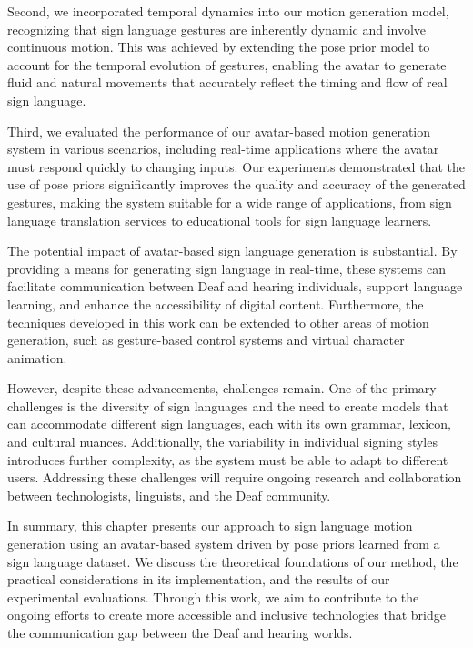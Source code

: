 \documentclass[../../main.tex]{subfiles}
\begin{document}
Second, we incorporated temporal dynamics into our motion generation model, recognizing that sign language gestures are inherently dynamic and involve continuous motion. This was achieved by extending the pose prior model to account for the temporal evolution of gestures, enabling the avatar to generate fluid and natural movements that accurately reflect the timing and flow of real sign language.

Third, we evaluated the performance of our avatar-based motion generation system in various scenarios, including real-time applications where the avatar must respond quickly to changing inputs. Our experiments demonstrated that the use of pose priors significantly improves the quality and accuracy of the generated gestures, making the system suitable for a wide range of applications, from sign language translation services to educational tools for sign language learners.

The potential impact of avatar-based sign language generation is substantial. By providing a means for generating sign language in real-time, these systems can facilitate communication between Deaf and hearing individuals, support language learning, and enhance the accessibility of digital content. Furthermore, the techniques developed in this work can be extended to other areas of motion generation, such as gesture-based control systems and virtual character animation.

However, despite these advancements, challenges remain. One of the primary challenges is the diversity of sign languages and the need to create models that can accommodate different sign languages, each with its own grammar, lexicon, and cultural nuances. Additionally, the variability in individual signing styles introduces further complexity, as the system must be able to adapt to different users. Addressing these challenges will require ongoing research and collaboration between technologists, linguists, and the Deaf community.

In summary, this chapter presents our approach to sign language motion generation using an avatar-based system driven by pose priors learned from a sign language dataset. We discuss the theoretical foundations of our method, the practical considerations in its implementation, and the results of our experimental evaluations. Through this work, we aim to contribute to the ongoing efforts to create more accessible and inclusive technologies that bridge the communication gap between the Deaf and hearing worlds.
\end{document}
